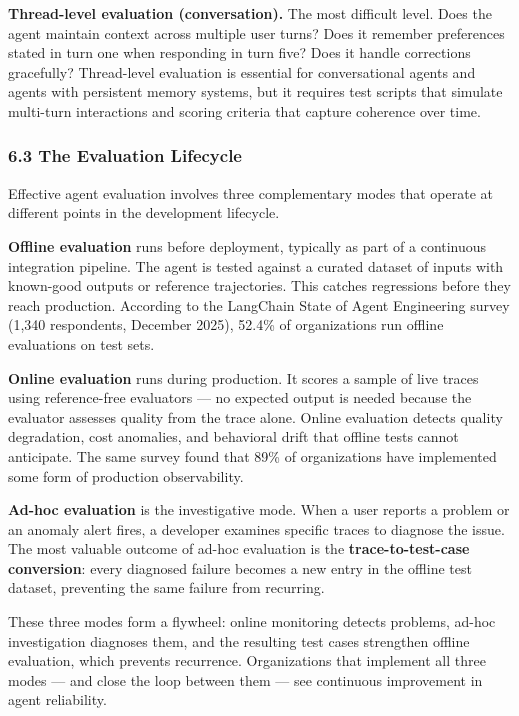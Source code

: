 \documentclass[11pt, a4paper]{article}
\begin{document}
\textbf{Thread-level evaluation (conversation).} The most difficult
level. Does the agent maintain context across multiple user turns? Does
it remember preferences stated in turn one when responding in turn five?
Does it handle corrections gracefully? Thread-level evaluation is
essential for conversational agents and agents with persistent memory
systems, but it requires test scripts that simulate multi-turn
interactions and scoring criteria that capture coherence over time.

\hypertarget{the-evaluation-lifecycle}{%
\subsubsection{6.3 The Evaluation
Lifecycle}\label{the-evaluation-lifecycle}}

Effective agent evaluation involves three complementary modes that
operate at different points in the development lifecycle.

\textbf{Offline evaluation} runs before deployment, typically as part of
a continuous integration pipeline. The agent is tested against a curated
dataset of inputs with known-good outputs or reference trajectories.
This catches regressions before they reach production. According to the
LangChain State of Agent Engineering survey (1,340 respondents, December
2025), 52.4\% of organizations run offline evaluations on test sets.

\textbf{Online evaluation} runs during production. It scores a sample of
live traces using reference-free evaluators --- no expected output is
needed because the evaluator assesses quality from the trace alone.
Online evaluation detects quality degradation, cost anomalies, and
behavioral drift that offline tests cannot anticipate. The same survey
found that 89\% of organizations have implemented some form of
production observability.

\textbf{Ad-hoc evaluation} is the investigative mode. When a user
reports a problem or an anomaly alert fires, a developer examines
specific traces to diagnose the issue. The most valuable outcome of
ad-hoc evaluation is the \textbf{trace-to-test-case conversion}: every
diagnosed failure becomes a new entry in the offline test dataset,
preventing the same failure from recurring.

These three modes form a flywheel: online monitoring detects problems,
ad-hoc investigation diagnoses them, and the resulting test cases
strengthen offline evaluation, which prevents recurrence. Organizations
that implement all three modes --- and close the loop between them ---
see continuous improvement in agent reliability.
\end{document}
